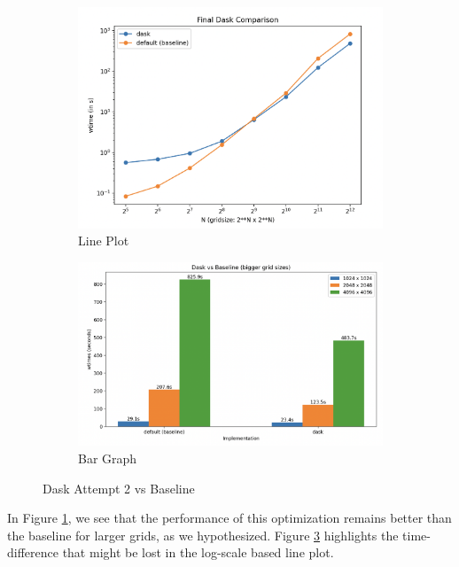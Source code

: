 \documentclass[a4paper,10pt]{article}
\begin{document}
\begin{figure}[h]
     \centering
     \begin{subfigure}[b]{0.45\textwidth}
        \centering
        \includegraphics[width=\linewidth]{images/dask/dask_final_plot.png}
        \caption{Line Plot}
        \label{fig:dask_final_plot}
     \end{subfigure}
     \hfill
     \begin{subfigure}[b]{0.45\textwidth}
        \centering
        \includegraphics[width=\linewidth]{images/dask/dask_final_bar.png}
        \caption{Bar Graph}
        \label{fig:dask_final_bar}
     \end{subfigure}
   \caption{Dask Attempt 2 vs Baseline}
\end{figure}
In Figure \ref{fig:dask_final_plot}, we see that the performance of this optimization remains better than the baseline for larger grids, as we hypothesized.
Figure \ref{fig:dask_final_bar} highlights the time-difference that might be lost in the log-scale based line plot.
\end{document}
